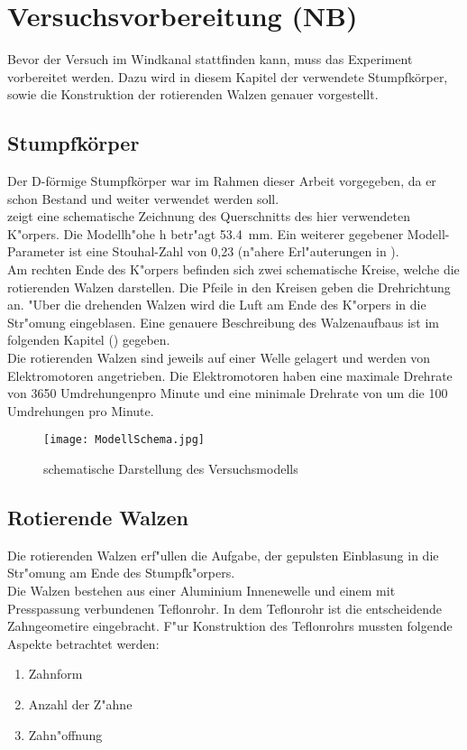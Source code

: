 \chapter{Versuchsvorbereitung (NB)}
\label{s:versuchsvorbereitung}
Bevor der Versuch im Windkanal stattfinden kann, muss das Experiment vorbereitet werden. Dazu wird in diesem Kapitel der verwendete Stumpfk\"orper, sowie die Konstruktion der rotierenden Walzen genauer vorgestellt.
\section{Stumpfk\"orper}
Der D-f\"ormige Stumpfk\"orper war im Rahmen dieser Arbeit vorgegeben, da er schon Bestand und weiter verwendet werden soll.\\
 zeigt eine schematische Zeichnung des Querschnitts des hier verwendeten K"orpers. Die Modellh"ohe h betr"agt \SI{53,4}{\milli\meter}.
Ein weiterer gegebener Modell-Parameter ist eine Stouhal-Zahl von 0,23 (n"ahere Erl"auterungen in ).\\
Am rechten Ende des K"orpers befinden sich zwei schematische Kreise, welche die rotierenden Walzen darstellen. Die Pfeile in den Kreisen geben die Drehrichtung an. "Uber die drehenden Walzen wird die Luft am Ende des K"orpers in die Str"omung eingeblasen. Eine genauere Beschreibung des Walzenaufbaus ist im folgenden Kapitel () gegeben.\\
Die rotierenden Walzen sind jeweils auf einer Welle gelagert und werden von Elektromotoren angetrieben. Die Elektromotoren haben eine maximale Drehrate von 3650 Umdrehungenpro Minute und eine minimale Drehrate von um die 100 Umdrehungen pro Minute.
\begin{figure}[h]
	\centering
	\texttt{[image: ModellSchema.jpg]}
	\caption{schematische Darstellung des Versuchsmodells}
	\label{fig:modelschema}
\end{figure}

\section{Rotierende Walzen}
\label{rotierendeWalze}
Die rotierenden Walzen erf"ullen die Aufgabe, der gepulsten Einblasung in die Str"omung am Ende des Stumpfk"orpers.\\
Die Walzen bestehen aus einer Aluminium Innenewelle und einem mit Presspassung verbundenen Teflonrohr. In dem Teflonrohr ist die entscheidende Zahngeometire eingebracht. F"ur Konstruktion des Teflonrohrs mussten folgende Aspekte betrachtet werden:
\begin{enumerate}
	\item Zahnform 
	\item Anzahl der Z"ahne
	\item Zahn"offnung 
\end{enumerate}

